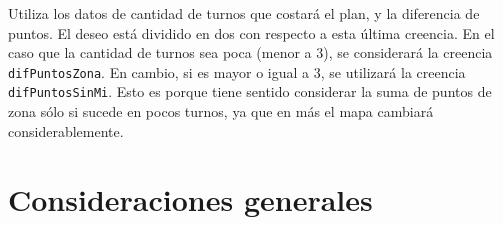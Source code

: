 \documentclass[oneside]{book}
\begin{document}
Utiliza los datos de cantidad de turnos que costará el plan, y la diferencia de puntos.
El deseo está dividido en dos con respecto a esta última creencia. En el caso que la
cantidad de turnos sea poca (menor a 3), se considerará la creencia 
\texttt{difPuntosZona}. En cambio, si es mayor o igual a 3, se utilizará la creencia
\texttt{difPuntosSinMi}. Esto es porque tiene sentido considerar la suma de puntos
de zona sólo si sucede en pocos turnos, ya que en más el mapa cambiará 
considerablemente. 






\chapter{Consideraciones generales}
\end{document}
